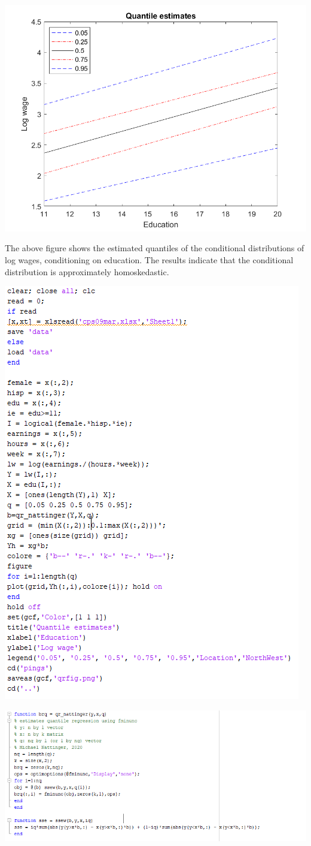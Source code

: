 \documentclass[11pt]{article} %
\begin{document}
\includegraphics{qrfig}

The above figure shows the estimated quantiles of the conditional distributions of log wages, conditioning on education. The results indicate that the conditional distribution is approximately homoskedastic.

\includegraphics{p3}

\includegraphics{p4}
\end{document}
